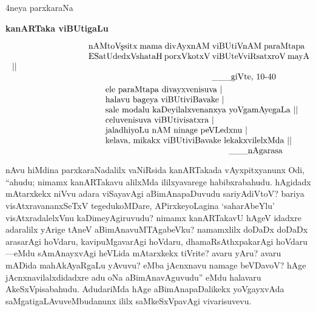 \documentclass[11pt,a4size]{article}
\begin{document}
\begin{center}
{\Huge 4neya parxkaraNa}

\smallskip
\textbf{\LARGE kanARTaka viBUtigaLu}
\end{center}

$$
\vbox{\parskip=0pt\parindent=0pt \everypar{\hskip9em} \obeylines
nAMtoV\char'263sitx mama divAyxnAM viBUtiVnAM paraMtapa
ESatUdedxVshataH porxVkotxV viBUteVviRsatxroV mayA ||

\hspace{5cm} \_\_\_giVte, 10-40

\smallskip
\qquad ele paraMtapa divayxvenisuva |
\qquad halavu bageya viBUtiviBavake |
\qquad sale modalu kaDeyilalxvenanxya yoVgamAyegaLa ||
\qquad celuvenisuva viBUtivisatxra |
\qquad jaladhiyoLu nAM ninage peVLedxnu |
\qquad kelava, mikakx viBUtiviBavake lekakxvilelxMda ||

\hspace{5.7cm} \_\_\_nAgarasa}
$$

nAvu hiMdina parxkaraNadalilx vaNiRsida kanARTakada vAyxpitxyanunx
Odi, ``ahudu; nimamx kanARTakavu alilxMda ililxyavarege
habibxrabahudu. hAgidadx mAtarxkekx niVvu adara viSayavAgi
aBimAnapaDuvudu sariyAdiVtoV? bariya visAtxravananxSeTxV
tegedukoMDare, APirxkeyoLagina `saharAbeYlu' visAtxradalelxVnu
kaDimeyAgiruvudu? nimamx kanARTakavU hAgeV idadxre adaralilx yArige
tAneV aBimAnavuMTAgabeVku? namamxlilx doDaDx doDaDx arasarAgi hoVdaru,
kavipuMgavarAgi hoVdaru, dhamaRsAthxpakarAgi hoVdaru---eMdu
sAmAnayxvAgi heVLida mAtarxkekx tiVrite? avaru yAru? avaru mADida
mahAkAyaRgaLu yAvuvu? eMba jAcnxnavu namage beVDavoV? hAge
jAcnxnavilalxdidadxre adu oNa aBimAnavAguvudu'' eMdu halavaru
AkeSxVpisabahudu. AdudariMda hAge aBimAnapaDalikekx yoVgayxvAda
saMgatigaLAvuveMbudanunx ililx saMkeSxVpavAgi vivarisuvevu.
\end{document}
